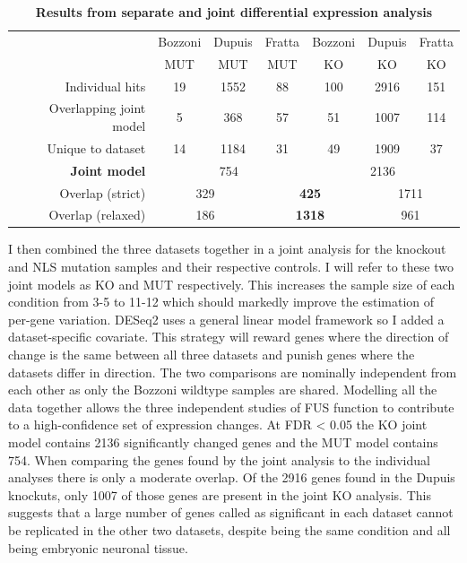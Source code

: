 \begingroup
\renewcommand{\arraystretch}{1.5}
\begin{table}[h!]
	\begin{tabular}{|r|ccc|ccc|}
		\hline
		& Bozzoni & Dupuis & Fratta & Bozzoni & Dupuis & Fratta\\[-0.3cm]
		& MUT & MUT & MUT & KO & KO & KO\\
		\hline
		Individual hits                & 19 & 1552 & 88 & 100 & 2916 & 151 \\
		Overlapping joint model & 5 & 368 & 57 & 51 & 1007 & 114 \\
		Unique to dataset          & 14 & 1184 & 31 & 49 & 1909 & 37 \\
		\hline
		\textbf{Joint model}       & \multicolumn{3}{c|}{754} & \multicolumn{3}{c|}{2136} \\
		\hline
		Overlap (strict)              & \multicolumn{2}{c}{329} & \multicolumn{2}{|c|}{\textbf{425}} & \multicolumn{2}{c|}{1711} \\
		Overlap (relaxed)           & \multicolumn{2}{c}{186} & \multicolumn{2}{|c|}{\textbf{1318} } & \multicolumn{2}{c|}{961} \\
		\hline
	\end{tabular}
	\caption{\textbf{Results from separate and joint differential expression analysis}}
	\label{tab:expression_results}
\end{table}
\endgroup


I then combined the three datasets together in a joint analysis for the knockout and NLS mutation samples and their respective controls. 
I will refer to these two joint models as KO and MUT respectively.
This increases the sample size of each condition from 3-5 to 11-12 which should markedly improve the estimation of per-gene variation. 
DESeq2 uses a general linear model framework so I  added a dataset-specific covariate. 
This strategy will reward genes where the direction of change is the same between all three datasets and punish genes where the datasets differ in direction. 
The two comparisons are nominally independent from each other as only the Bozzoni wildtype samples are shared.
Modelling all the data together allows the three independent studies of FUS function to contribute to a high-confidence set of expression changes. 
At FDR < 0.05 the KO joint model contains 2136 significantly changed genes and the MUT model contains 754. 
When comparing the genes found by the joint analysis to the individual analyses there is only a moderate overlap. 
Of the 2916 genes found in the Dupuis knockuts, only 1007 of those genes are present in the joint KO analysis.
This suggests that a large number of genes called as significant in each dataset cannot be replicated in the other two datasets, despite being the same condition and all being embryonic neuronal tissue.

